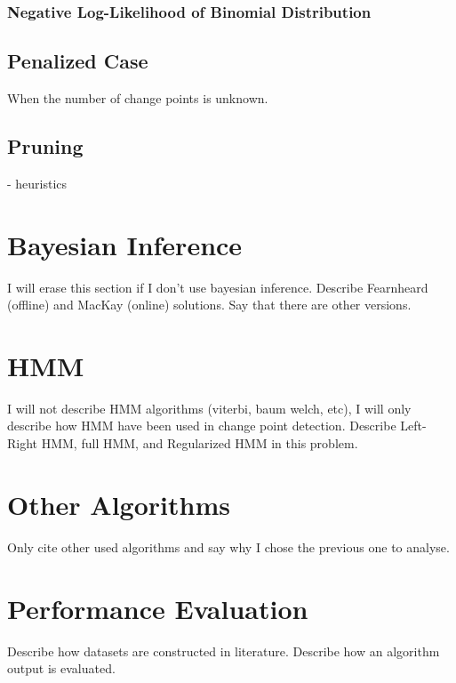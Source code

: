 \subsubsection{Negative Log-Likelihood of Binomial Distribution}

\subsection{Penalized Case}

When the number of change points is unknown.

\subsection{Pruning}
- heuristics

\section{Bayesian Inference}
I will erase this section if I don't use bayesian inference. Describe Fearnheard (offline) and MacKay (online) solutions. Say that there are other versions.

\section{HMM}
I will not describe HMM algorithms (viterbi, baum welch, etc), I will only describe how HMM have been used in change point detection. Describe Left-Right HMM, full HMM, and Regularized HMM in this problem.

\section{Other Algorithms}
Only cite other used algorithms and say why I chose the previous one to analyse.

\section{Performance Evaluation}
  Describe how datasets are constructed in literature. Describe how an algorithm output is evaluated.

